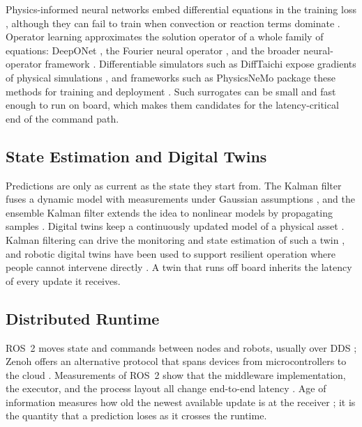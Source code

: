 Physics-informed neural networks embed differential equations in the training
loss \cite{raissi2019pinn}, although they can fail to train when convection or
reaction terms dominate \cite{krishnapriyan2021pinn}.  Operator learning
approximates the solution operator of a whole family of equations: DeepONet
\cite{lu2021deeponet}, the Fourier neural operator \cite{li2021fno}, and the
broader neural-operator framework \cite{kovachki2023neuraloperator}.
Differentiable simulators such as DiffTaichi expose gradients of physical
simulations \cite{hu2020difftaichi}, and frameworks such as PhysicsNeMo package
these methods for training and deployment \cite{nvidia2026physicsnemo}.  Such
surrogates can be small and fast enough to run on board, which makes them
candidates for the latency-critical end of the command path.

\subsection{State Estimation and Digital Twins}

Predictions are only as current as the state they start from.  The Kalman filter
fuses a dynamic model with measurements under Gaussian assumptions
\cite{kalman1960}, and the ensemble Kalman filter extends the idea to nonlinear
models by propagating samples \cite{evensen1994enkf}.  Digital twins keep a
continuously updated model of a physical asset \cite{glaessgen2012digitaltwin}.
Kalman filtering can drive the monitoring and state estimation of such a twin
\cite{feng2023dtkf}, and robotic digital twins have been used to support
resilient operation where people cannot intervene directly
\cite{harper2023digitaltwin}.  A twin that runs off board inherits the latency
of every update it receives.

\subsection{Distributed Runtime}

ROS~2 moves state and commands between nodes and robots, usually over DDS
\cite{macenski2022ros2,omg2015dds}; Zenoh offers an alternative protocol that
spans devices from microcontrollers to the cloud \cite{corsaro2023zenoh}.
Measurements of ROS~2 show that the middleware implementation, the executor, and
the process layout all change end-to-end latency
\cite{maruyama2016ros2,kronauer2021latency}.  Age of information measures how old
the newest available update is at the receiver \cite{kaul2012aoi}; it is the
quantity that a prediction loses as it crosses the runtime.

